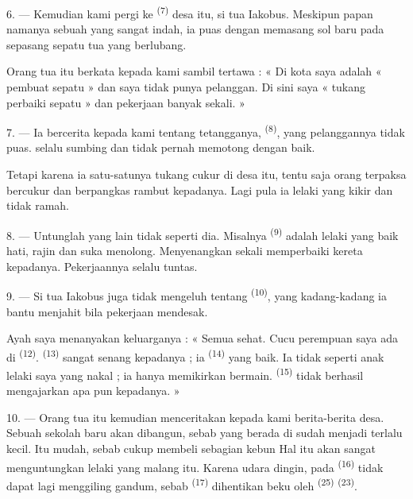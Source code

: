 6. --- Kemudian kami pergi ke 
\textsuperscript{(7)} desa itu, si tua Iakobus. Meskipun papan namanya
sebuah  yang sangat indah, ia puas dengan memasang
sol baru pada sepasang sepatu tua yang berlubang.

Orang tua itu berkata kepada kami sambil tertawa : « Di kota saya
adalah « pembuat sepatu » dan saya tidak punya pelanggan. Di sini
saya « tukang perbaiki sepatu » dan pekerjaan banyak sekali. »

7. --- Ia bercerita kepada kami tentang tetangganya,  \textsuperscript{(8)}, yang pelanggannya tidak puas.  selalu sumbing dan  tidak pernah memotong
dengan baik.

Tetapi karena ia satu-satunya tukang cukur di desa itu, tentu saja
orang terpaksa bercukur dan berpangkas rambut kepadanya. Lagi pula ia
lelaki yang kikir dan tidak ramah.

8. --- Untunglah  yang lain tidak seperti dia.
Misalnya  \textsuperscript{(9)} adalah lelaki yang
baik hati, rajin dan suka menolong. Menyenangkan sekali memperbaiki
kereta kepadanya. Pekerjaannya selalu tuntas.

9. --- Si tua Iakobus juga tidak mengeluh tentang  \textsuperscript{(10)}, yang kadang-kadang ia bantu menjahit
 bila pekerjaan mendesak.

Ayah saya menanyakan keluarganya : « Semua sehat. Cucu perempuan saya
ada di  \textsuperscript{(12)}.  \textsuperscript{(13)} sangat senang kepadanya ; ia
 \textsuperscript{(14)} yang baik. Ia tidak seperti anak
lelaki saya yang nakal ; ia hanya memikirkan bermain. 
\textsuperscript{(15)} tidak berhasil mengajarkan apa pun kepadanya. »

\VUsaut{3.0mm}
\VUsaut{3.0mm}

10. --- Orang tua itu kemudian menceritakan kepada kami berita-berita
desa. Sebuah sekolah baru akan dibangun, sebab yang berada di
 sudah menjadi terlalu kecil. Itu mudah, sebab
cukup membeli sebagian kebun  Hal itu akan
sangat menguntungkan lelaki yang malang itu. Karena udara dingin,
 pada 
\textsuperscript{(16)} tidak dapat lagi menggiling gandum, sebab
 \textsuperscript{(17)} dihentikan beku oleh 
\textsuperscript{(25)}  \textsuperscript{(23)}.

